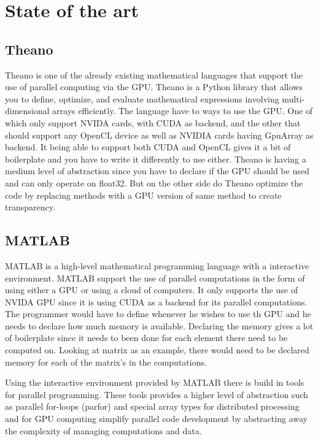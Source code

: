 \chapter{State of the art}

\section{Theano}
Theano is one of the already existing mathematical languages that support the use of parallel computing via the GPU.
Theano is a Python library that allows you to define, optimize, and evaluate mathematical expressions involving multi-dimensional arrays efficiently.
The language have to ways to use the GPU.
One of which only support NVIDA cards, with CUDA as backend, and the other that should support any OpenCL device as well as NVIDIA cards having GpuArray as backend.
It being able to support both CUDA and OpenCL gives it a bit of boilerplate and you have to write it differently to use either.
Theano is having a medium level of abstraction since you have to declare if the GPU should be used and can only operate on float32.
But on the other side do Theano optimize the code by replacing methods with a GPU version of same method to create transparency.\citep{Theano,Theano_GPU}

\section{MATLAB}
MATLAB is a high-level mathematical programming language with a interactive environment.
MATLAB support the use of parallel computations in the form of using either a GPU or using a cloud of computers.
It only supports the use of NVIDA GPU since it is using CUDA as a backend for its parallel computations.
The programmer would have to define whenever he wishes to use th GPU and he needs to declare how much memory is available.
Declaring the memory gives a lot of boilerplate since it needs to been done for each element there need to be computed on.
Looking at matrix as an example, there would need to be declared memory for each of the matrix's in the computations\citep{MATLAB_backend,MATLAB_benchmark,}.

Using the interactive environment provided by MATLAB there is build in tools for parallel programming.
These tools provides a higher level of abstraction such as parallel for-loops (parfor) and special array types for distributed processing and for GPU computing simplify parallel code development by abstracting away the complexity of managing computations and data\citep{MATLAB_parallel}.


